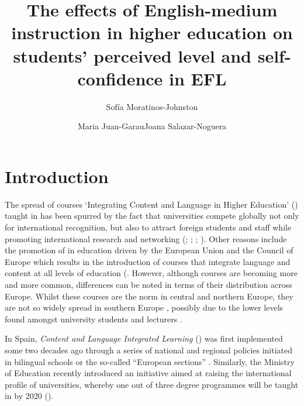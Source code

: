 \documentclass[output=paper]{langsci/langscibook}
\author{Sofía Moratinos-Johnston\affiliation{University of the Balearic Islands }\and Maria Juan-Garau\affiliation{University of the Balearic Islands }\lastand Joana Salazar-Noguera\affiliation{University of the Balearic Islands }}
\title{The effects of English-medium instruction in higher education on students' perceived level and self-confidence in EFL}
\begin{document}
 

\section{Introduction} 

The spread of courses ‘Integrating Content and Language in Higher Education’ () taught in  has been spurred by the fact that universities compete globally not only for international recognition, but also to attract foreign students and staff while promoting international research and networking (\citealt{Coleman2006}; \citealt{Graddol2006}; \citealt{Lasagabaster2015}; \citealt{Pérez-Vidal2015forall}). Other reasons include the promotion of  in education driven by the European Union and the Council of Europe which results in the introduction of courses that integrate language and content at all levels of education (\cite{EuropeanHigherEducationArea2009}. However, although  courses are becoming more and more common, differences can be noted in terms of their distribution across Europe. Whilst these courses are the norm in central and northern Europe, they are not so widely spread in southern Europe \citep{WächterMaiworm2014}, possibly due to the lower  levels found amongst university students and lecturers \citep{Cots2013,Arnó-MaciàMancho-Barés2015}. 



In Spain, \textit{Content and Language Integrated Learning} () was first implemented some two decades ago through a series of national and regional policies initiated in bilingual schools or the so-called ``European sections'' \citep{Cañado2010,Juan-GarauSalazar-Noguera2015}. Similarly, the  Ministry of Education recently introduced an initiative aimed at raising the international profile of  universities, whereby one out of three degree programmes will be taught in  by 2020 (\citealt{SpanishMinistryofEducation2015}). 
\end{document}
